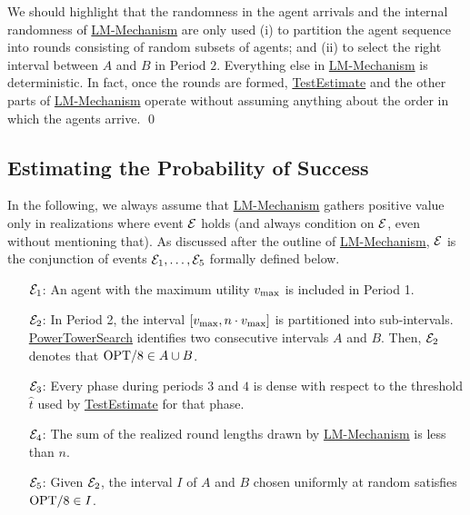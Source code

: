 \begin{remark}We should highlight that the randomness in the agent arrivals and the internal randomness of \hyperref[alg:LMMECH]{LM-Mechanism} are only used (i) to partition the agent sequence into rounds consisting of random subsets of agents; and (ii) to select the right interval between $A$ and $B$ in Period $2$. Everything else in \hyperref[alg:LMMECH]{LM-Mechanism} is deterministic. In fact, once the rounds are formed, \hyperref[alg:TestTHRESHOLD]{TestEstimate} and the other parts of  \hyperref[alg:LMMECH]{LM-Mechanism} operate without assuming anything about the order in which the agents arrive. \qed
 \end{remark}

\subsection{Estimating the Probability of Success}
\label{sec:successProb}

In the following, we always assume that \hyperref[alg:LMMECH]{LM-Mechanism} gathers positive value only in realizations where event $\mathcal{E}$ holds (and always condition on $\mathcal{E}$, even without mentioning that). As discussed after the outline of \hyperref[alg:LMMECH]{LM-Mechanism}, $\mathcal{E}$ is the conjunction of events $\mathcal{E}_1, \ldots, \mathcal{E}_5$ formally defined below.

    \begin{enumerate}
        \item [$\mathcal{E}_1$:] An agent with the maximum utility $v_{\text{max}}$ is included in Period 1.
        
        \item [$\mathcal{E}_2$:] In Period 2, the interval $[v_{\text{max}}, n \cdot v_{\text{max}}]$ is partitioned into sub-intervals. \hyperref[alg:PowerTower]{PowerTowerSearch} identifies two consecutive intervals $A$ and $B$. Then, $\mathcal{E}_2$ denotes that $\mathrm{OPT} / 8 \in A \cup B$.
        
        \item [$\mathcal{E}_3$:] Every phase during periods $3$ and $4$ is dense with respect to the threshold $\hat{t}$ used by \hyperref[alg:TestTHRESHOLD]{TestEstimate} for that phase.  

        
        \item [$\mathcal{E}_4$:] The sum of the realized round lengths drawn by \hyperref[alg:LMMECH]{LM-Mechanism} is less than $n$.
        
        \item [$\mathcal{E}_5$:] Given $\mathcal{E}_2$, the interval $I$ of $A$ and $B$ chosen uniformly at random satisfies $\mathrm{OPT} / 8 \in I$. 
    \end{enumerate}


